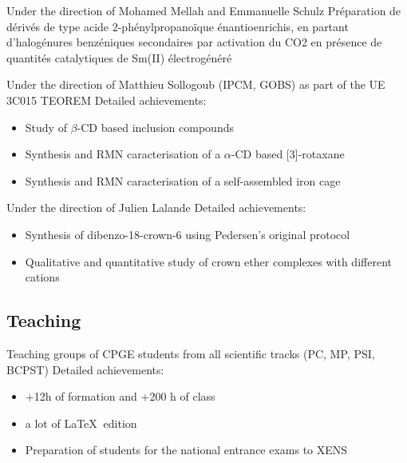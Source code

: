 \documentclass[11pt,a4paper,sans]{moderncv}
\begin{document}
%
{Under the direction of Mohamed Mellah and Emmanuelle Schulz\newline{}%
Préparation de dérivés de type acide 2-phénylpropanoïque énantioenrichis, en partant d'halogénures benzéniques secondaires par activation du CO2 en présence de quantités catalytiques de Sm(II) électrogénéré
}


%
{Under the direction of Matthieu Sollogoub (IPCM, GOBS) as part of the UE 3C015 TEOREM\newline{}%
Detailed achievements:%
\begin{itemize}%
\item Study of $\beta$-CD based inclusion compounds
\item Synthesis and RMN caracterisation of a $\alpha$-CD based [3]-rotaxane
\item Synthesis and RMN caracterisation of a self-assembled iron cage
\end{itemize}
}

%
{Under the direction of Julien Lalande \newline{}%
Detailed achievements:%
\begin{itemize}%
\item Synthesis of dibenzo-18-crown-6 using Pedersen's original protocol
\item Qualitative and quantitative study of crown ether complexes with different cations
\end{itemize}
}


\subsection{Teaching}
%
{Teaching groups of CPGE students from all scientific tracks (PC, MP, PSI, BCPST)\newline{}%
Detailed achievements:%
\begin{itemize}%
\item +12h of formation and +200 h of class
\item a lot of {\LaTeX} $~$edition
\item Preparation of students for the national entrance exams to XENS
\end{itemize}
}
\end{document}
